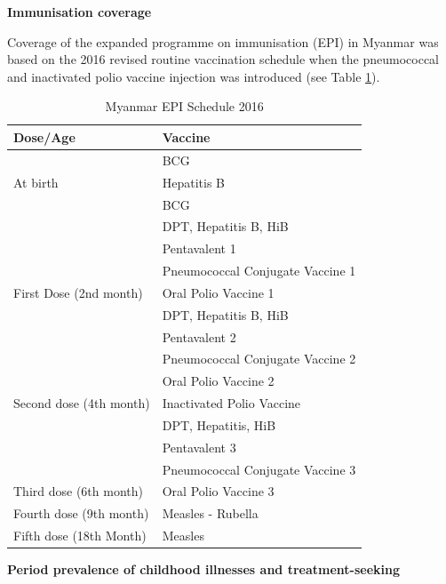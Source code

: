 \documentclass[12pt,a4paper]{article}
\begin{document}
\textbf{Immunisation coverage}

Coverage of the expanded programme on immunisation (EPI) in Myanmar was based on the 2016 revised routine vaccination schedule when the pneumococcal and inactivated polio vaccine injection was introduced \citep{MoHMyanmar:2016wp} (see Table \ref{tab:epi1}).

\begin{table}[H]

\caption{\label{tab:epi1}Myanmar EPI Schedule 2016}
\centering
\begin{tabular}[t]{ll}
\toprule
\textbf{Dose/Age} & \textbf{Vaccine}\\
\midrule
 & BCG\\
\cmidrule{2-2}
\multirow{-2}{*}{\raggedright\arraybackslash At birth} & Hepatitis B\\
\cmidrule{1-2}
 & BCG\\
\cmidrule{2-2}
 & DPT, Hepatitis B, HiB\\
\cmidrule{2-2}
 & Pentavalent 1\\
\cmidrule{2-2}
 & Pneumococcal Conjugate Vaccine 1\\
\cmidrule{2-2}
\multirow{-5}{*}{\raggedright\arraybackslash First Dose (2nd month)} & Oral Polio Vaccine 1\\
\cmidrule{1-2}
 & DPT, Hepatitis B, HiB\\
\cmidrule{2-2}
 & Pentavalent 2\\
\cmidrule{2-2}
 & Pneumococcal Conjugate Vaccine 2\\
\cmidrule{2-2}
 & Oral Polio Vaccine 2\\
\cmidrule{2-2}
\multirow{-5}{*}{\raggedright\arraybackslash Second dose (4th month)} & Inactivated Polio Vaccine\\
\cmidrule{1-2}
 & DPT, Hepatitis, HiB\\
\cmidrule{2-2}
 & Pentavalent 3\\
\cmidrule{2-2}
 & Pneumococcal Conjugate Vaccine 3\\
\cmidrule{2-2}
\multirow{-4}{*}{\raggedright\arraybackslash Third dose (6th month)} & Oral Polio Vaccine 3\\
\cmidrule{1-2}
Fourth dose (9th month) & Measles - Rubella\\
\cmidrule{1-2}
Fifth dose (18th Month) & Measles\\
\bottomrule
\end{tabular}
\end{table}

\textbf{Period prevalence of childhood illnesses and treatment-seeking}
\end{document}
